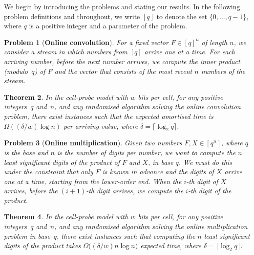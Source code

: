 \documentclass[11pt]{article}
\numberwithin{equation}{section}
\newtheorem{theorem}{Theorem}[section]
\theoremstyle{definition}
\theoremstyle{plain}
\newtheorem{problem}[theorem]{Problem}
\begin{document}
We begin by introducing the problems and stating our results. In the following problem definitions and throughout, we write $[q]$ to denote the set $\{0,\dots,q-1\}$, where $q$ is a positive integer and a parameter of the problem.

\begin{problem}[\textbf{Online convolution}]
  For a fixed vector $F\in[q]^n$ of length $n$, we consider a stream in which numbers from $[q]$ arrive one at a time. For each arriving number, before the next number arrives, we
%
compute  %
the inner product (modulo~$q$) of $F$ and the vector that consists of the most recent  $n$ numbers of the stream.
\end{problem}

%

\begin{theorem}
	\label{thm:conv}
	In the cell-probe model with $w$ bits per cell, for any positive integers~$q$ and~$n$, and any randomised algorithm solving the online convolution problem, there exist instances such that the expected amortised time is  $\Omega{(({\delta}/{w})\log n)}$ per arriving value, where $\delta=\lceil \log_{2}{q} \rceil$.
\end{theorem}

%

%
%
%
%

\begin{problem}[\textbf{Online multiplication}]
Given two numbers $F,X\in [q^n]$, where $q$ is the base and $n$ is the number of digits per number, we want to
%
compute   %
the $n$ least significant digits of the product of $F$ and $X$, in base $q$.
	We must do this under the constraint that only $F$ is known in advance and the digits of $X$ arrive one at a time, starting from the lower-order end.
	When the $i$-th digit of $X$
%
arrives,   %
before the $(i+1)$-th digit
%
arrives,   %
we
%
compute   %
the $i$-th digit of the product.
\end{problem}

\begin{theorem}
	\label{thm:mult}
	In the cell-probe model with $w$ bits per cell, for any positive integers~$q$ and~$n$, and any randomised algorithm solving the online multiplication problem in base~$q$, there exist instances such that
%
computing    %
the $n$ least significant digits of the product takes $\Omega{(({\delta}/{w})n\log n})$ expected time, where $\delta=\lceil \log_2q \rceil$.
\end{theorem}

%
\end{document}
